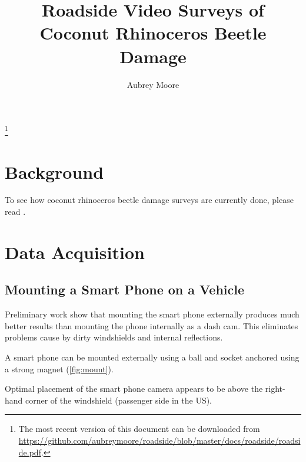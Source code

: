\documentclass[12pt,letterpaper,english,bibliography=totocnumbered, abstract=on]{scrartcl}
\begin{document}

\title{Roadside Video Surveys of Coconut Rhinoceros Beetle Damage}

\author{Aubrey Moore}

\date{\DTMnow}

\maketitle

\tableofcontents

\footnote{The most recent version of this document can be downloaded from\\
\url{https://github.com/aubreymoore/roadside/blob/master/docs/roadside/roadside.pdf}.}

\pagebreak

\section{Background}

To see how coconut rhinoceros beetle damage surveys are currently done, please read \cite{vaqalo_coconut_2017}.

\section{Data Acquisition}

\subsection{Mounting a Smart Phone on a Vehicle}

Preliminary work show that mounting the smart phone externally produces much better results than mounting the phone internally as a dash cam. This eliminates problems cause by dirty windshields and internal reflections.  

A smart phone can be mounted externally using a ball and socket anchored using a strong magnet (\ref{fig:mount}).

Optimal placement of the smart phone camera appears to be above the right-hand corner of the windshield (passenger side in the US). 
\end{document}
